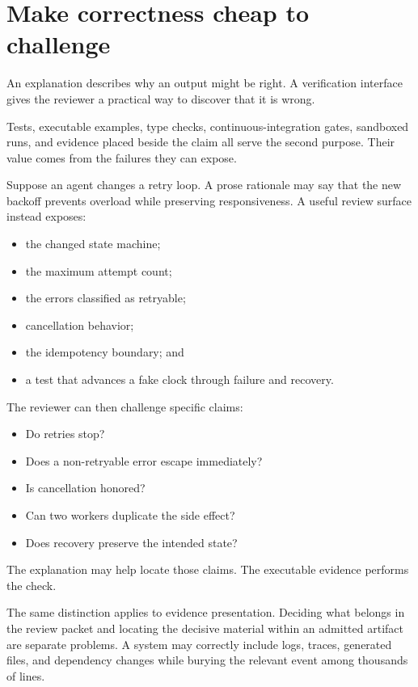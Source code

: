 \section{Make correctness cheap to challenge}\label{make-correctness-cheap-to-challenge}

An explanation describes why an output might be right. A verification interface gives the reviewer a practical way to discover that it is wrong.

Tests, executable examples, type checks, continuous-integration gates, sandboxed runs, and evidence placed beside the claim all serve the second purpose. Their value comes from the failures they can expose.

Suppose an agent changes a retry loop. A prose rationale may say that the new backoff prevents overload while preserving responsiveness. A useful review surface instead exposes:

\begin{itemize}
\tightlist
\item
  the changed state machine;
\item
  the maximum attempt count;
\item
  the errors classified as retryable;
\item
  cancellation behavior;
\item
  the idempotency boundary; and
\item
  a test that advances a fake clock through failure and recovery.
\end{itemize}

The reviewer can then challenge specific claims:

\begin{itemize}
\tightlist
\item
  Do retries stop?
\item
  Does a non-retryable error escape immediately?
\item
  Is cancellation honored?
\item
  Can two workers duplicate the side effect?
\item
  Does recovery preserve the intended state?
\end{itemize}

The explanation may help locate those claims. The executable evidence performs the check.

The same distinction applies to evidence presentation. Deciding what belongs in the review packet and locating the decisive material within an admitted artifact are separate problems. A system may correctly include logs, traces, generated files, and dependency changes while burying the relevant event among thousands of lines.


